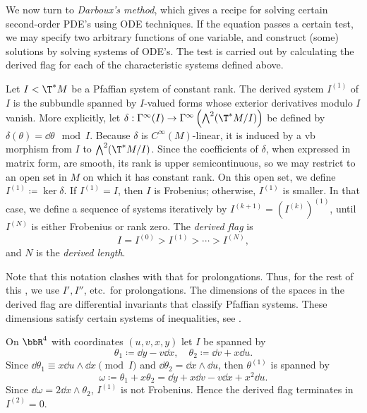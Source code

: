 We now turn to \emph{Darboux's method}, which gives a recipe for solving certain second-order PDE's using ODE techniques. If the equation passes a certain test, we may specify two arbitrary functions of one variable, and construct (some) solutions by solving systems of ODE's. The test is carried out by calculating the derived flag for each of the characteristic systems defined above.


\begin{defn}
    Let $I<\T^\ast M$ be a Pfaffian system of constant rank. The derived system $I^{(1)}$ of $I$ is the subbundle spanned by $I$-valued forms whose exterior derivatives modulo $I$ vanish. More explicitly, let $\delta:\Gamma^\infty(I)\to \Gamma^\infty\left(\bigwedge^2(\T^\ast M\slash I)\right)$ be defined by $\delta(\theta)=\dd\theta\mod I$. Because $\delta$ is $C^\infty(M)$-linear, it is induced by a \gls{vb} morphism from $I$ to $\bigwedge^2(\T^\ast M\slash I)$. Since the coefficients of $\delta$, when expressed in matrix form, are smooth, its rank is upper semicontinuous, so we may restrict to an open set in $M$ on which it has constant rank. On this open set, we define $I^{(1)}\coloneqq \ker\delta$. If $I^{(1)}=I$, then $I$ is Frobenius; otherwise, $I^{(1)}$ is smaller. In that case, we define a sequence of systems iteratively by $I^{(k+1)}=(I^{(k)})^{(1)}$, until $I^{(N)}$ is either Frobenius or rank zero. The \emph{derived flag} is 
    \[I=I^{(0)}> I^{(1)}>\cdots >I^{(N)},\]
    and $N$ is the \emph{derived length}.
\end{defn}

Note that this notation clashes with that for prolongations. Thus, for the rest of this \subsect, we use $I',I''$, etc.\ for prolongations. The dimensions of the spaces in the derived flag are differential invariants that classify Pfaffian systems. These dimensions satisfy certain systems of inequalities, see \cite{Bryant}.

\begin{example}
    On $\bbR^4$ with coordinates $(u,v,x,y)$ let $I$ be spanned by 
    \[\theta_1\coloneqq \dd y-v\dd x,\quad \theta_2\coloneqq \dd v+x\dd u.\]
    Since $\dd\theta_1\equiv x\dd u\wedge \dd x\pmod{I}$ and $\dd\theta_2=\dd x\wedge\dd u$, then $\theta^{(1)}$ is spanned by 
    \[\omega\coloneqq \theta_1+x\theta_2=\dd y+x\dd v-v \dd x+x^2\dd u.\]
    Since $\dd\omega=2\dd x\wedge\theta_2$, $I^{(1)}$ is not Frobenius. Hence the derived flag terminates in $I^{(2)}=0$.
\end{example}



